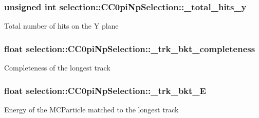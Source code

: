 \subsubsection[{\texorpdfstring{\+\_\+total\+\_\+hits\+\_\+y}{_total_hits_y}}]{\setlength{\rightskip}{0pt plus 5cm}unsigned int selection\+::\+C\+C0pi\+Np\+Selection\+::\+\_\+total\+\_\+hits\+\_\+y\hspace{0.3cm}{\ttfamily [private]}}\hypertarget{classselection_1_1CC0piNpSelection_a819d1d973e74bcd2ad82aa01ea24ac37}{}\label{classselection_1_1CC0piNpSelection_a819d1d973e74bcd2ad82aa01ea24ac37}
Total number of hits on the Y plane 
\subsubsection[{\texorpdfstring{\+\_\+trk\+\_\+bkt\+\_\+completeness}{_trk_bkt_completeness}}]{\setlength{\rightskip}{0pt plus 5cm}float selection\+::\+C\+C0pi\+Np\+Selection\+::\+\_\+trk\+\_\+bkt\+\_\+completeness\hspace{0.3cm}{\ttfamily [private]}}\hypertarget{classselection_1_1CC0piNpSelection_aab22ce289e2d4a109440369e30fddf52}{}\label{classselection_1_1CC0piNpSelection_aab22ce289e2d4a109440369e30fddf52}
Completeness of the longest track 
\subsubsection[{\texorpdfstring{\+\_\+trk\+\_\+bkt\+\_\+E}{_trk_bkt_E}}]{\setlength{\rightskip}{0pt plus 5cm}float selection\+::\+C\+C0pi\+Np\+Selection\+::\+\_\+trk\+\_\+bkt\+\_\+E\hspace{0.3cm}{\ttfamily [private]}}\hypertarget{classselection_1_1CC0piNpSelection_aa7a6076f1169185e0b2b02fbb03aba22}{}\label{classselection_1_1CC0piNpSelection_aa7a6076f1169185e0b2b02fbb03aba22}
Energy of the M\+C\+Particle matched to the longest track 
